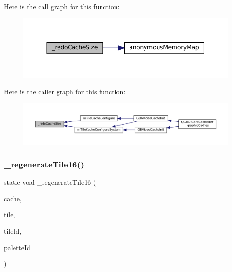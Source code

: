 Here is the call graph for this function\+:
\nopagebreak
\begin{figure}[H]
\begin{center}
\leavevmode
\includegraphics[width=344pt]{tile-cache_8c_a153de28ed2867a57b6de1dff09c616b2_cgraph}
\end{center}
\end{figure}
Here is the caller graph for this function\+:
\nopagebreak
\begin{figure}[H]
\begin{center}
\leavevmode
\includegraphics[width=350pt]{tile-cache_8c_a153de28ed2867a57b6de1dff09c616b2_icgraph}
\end{center}
\end{figure}
\mbox{\label{tile-cache_8c_ac73c7b43d4ecb49d64c6e6f47d5295a6}} 
\subsubsection{\texorpdfstring{\+\_\+regenerate\+Tile16()}{\_regenerateTile16()}}
{\footnotesize\ttfamily static void \+\_\+regenerate\+Tile16 (\begin{DoxyParamCaption}\item[{struct m\+Tile\+Cache $\ast$}]{cache,  }\item[{color\+\_\+t $\ast$}]{tile,  }\item[{unsigned}]{tile\+Id,  }\item[{unsigned}]{palette\+Id }\end{DoxyParamCaption})\hspace{0.3cm}{\ttfamily [static]}}


